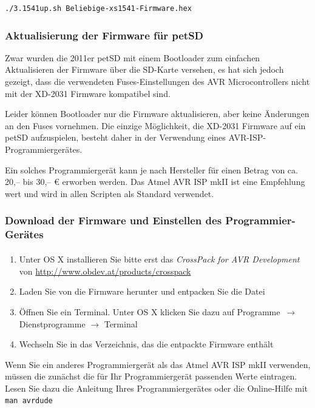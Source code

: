\documentclass[10pt,a4paper]{scrartcl}		%
\begin{document}
\begin{verbatim}
./3.1541up.sh Beliebige-xs1541-Firmware.hex
\end{verbatim}

\subsubsection{Aktualisierung der Firmware für petSD}
\label{petsdfwinst}
Zwar wurden die 2011er petSD mit einem Bootloader zum einfachen
Aktualisieren der Firmware über die SD-Karte versehen, es hat
sich jedoch gezeigt, dass die verwendeten Fuses-Einstellungen
des AVR Microcontrollers nicht mit der 
\mbox{XD-2031} Firmware kompatibel sind.

Leider können Bootloader nur die Firmware aktualisieren, 
aber keine Änderungen an den Fuses vornehmen. 
Die einzige Möglichkeit, die XD-2031 Firmware
auf ein petSD aufzuspielen, besteht daher in der Verwendung eines
AVR-ISP-Programmiergerätes. 

Ein solches Programmiergerät kann je nach Hersteller 
für einen Betrag von ca. 20,-- bis 30,-- \euro{} erworben werden. 
Das Atmel AVR ISP mkII ist eine Empfehlung wert und wird in allen
Scripten als Standard verwendet.

\subsubsection*{Download der Firmware und Einstellen des
Programmier-Gerätes}
\begin{enumerate}
\item Unter OS X installieren Sie bitte erst das 
\textit{CrossPack for AVR\textsuperscript{\textregistered} Development} von 
\url{http://www.obdev.at/products/crosspack}

\item Laden Sie von \fwbinaries{} die Firmware herunter und entpacken Sie 
die Datei

\item Öffnen Sie ein Terminal. Unter OS X klicken Sie dazu auf 
\glqq Programme\grqq\ $\to$ \glqq Dienstprogramme\grqq
$\to$ \glqq Terminal\grqq{}

\item Wechseln Sie in das Verzeichnis, das die entpackte Firmware enthält
\end{enumerate}

Wenn Sie ein anderes Programmiergerät als das Atmel AVR ISP mkII
verwenden, müssen die zunächst die für Ihr Programmiergerät passenden
Werte eintragen. Lesen Sie dazu die Anleitung Ihres Programmiergerätes oder 
die Online-Hilfe mit \texttt{man avrdude}
\end{document}
